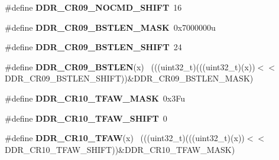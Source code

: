 \begin{DoxyCompactItemize}
\item 
\hypertarget{group___d_d_r___register___masks_ga78f46b37d1d9031c010ac4f32b38c45a}{}\#define {\bfseries D\+D\+R\+\_\+\+C\+R09\+\_\+\+N\+O\+C\+M\+D\+\_\+\+S\+H\+I\+F\+T}~16\label{group___d_d_r___register___masks_ga78f46b37d1d9031c010ac4f32b38c45a}

\item 
\hypertarget{group___d_d_r___register___masks_ga4c7f0ca0a836c4669e32ce4dcab4cd97}{}\#define {\bfseries D\+D\+R\+\_\+\+C\+R09\+\_\+\+B\+S\+T\+L\+E\+N\+\_\+\+M\+A\+S\+K}~0x7000000u\label{group___d_d_r___register___masks_ga4c7f0ca0a836c4669e32ce4dcab4cd97}

\item 
\hypertarget{group___d_d_r___register___masks_gaf14d2e173d38ce3d1227c04496cbcd52}{}\#define {\bfseries D\+D\+R\+\_\+\+C\+R09\+\_\+\+B\+S\+T\+L\+E\+N\+\_\+\+S\+H\+I\+F\+T}~24\label{group___d_d_r___register___masks_gaf14d2e173d38ce3d1227c04496cbcd52}

\item 
\hypertarget{group___d_d_r___register___masks_ga304381d47292897a1f71405f861be1a0}{}\#define {\bfseries D\+D\+R\+\_\+\+C\+R09\+\_\+\+B\+S\+T\+L\+E\+N}(x)                                          ~(((uint32\+\_\+t)(((uint32\+\_\+t)(x))$<$$<$D\+D\+R\+\_\+\+C\+R09\+\_\+\+B\+S\+T\+L\+E\+N\+\_\+\+S\+H\+I\+F\+T))\&D\+D\+R\+\_\+\+C\+R09\+\_\+\+B\+S\+T\+L\+E\+N\+\_\+\+M\+A\+S\+K)\label{group___d_d_r___register___masks_ga304381d47292897a1f71405f861be1a0}

\item 
\hypertarget{group___d_d_r___register___masks_gadd56500c472ce40ea6f6a335e49252f7}{}\#define {\bfseries D\+D\+R\+\_\+\+C\+R10\+\_\+\+T\+F\+A\+W\+\_\+\+M\+A\+S\+K}~0x3\+Fu\label{group___d_d_r___register___masks_gadd56500c472ce40ea6f6a335e49252f7}

\item 
\hypertarget{group___d_d_r___register___masks_ga5540561673eda03d9008474d171089bf}{}\#define {\bfseries D\+D\+R\+\_\+\+C\+R10\+\_\+\+T\+F\+A\+W\+\_\+\+S\+H\+I\+F\+T}~0\label{group___d_d_r___register___masks_ga5540561673eda03d9008474d171089bf}

\item 
\hypertarget{group___d_d_r___register___masks_ga536ed3653156cb8d143dde37e624b0d3}{}\#define {\bfseries D\+D\+R\+\_\+\+C\+R10\+\_\+\+T\+F\+A\+W}(x)                                              ~(((uint32\+\_\+t)(((uint32\+\_\+t)(x))$<$$<$D\+D\+R\+\_\+\+C\+R10\+\_\+\+T\+F\+A\+W\+\_\+\+S\+H\+I\+F\+T))\&D\+D\+R\+\_\+\+C\+R10\+\_\+\+T\+F\+A\+W\+\_\+\+M\+A\+S\+K)\label{group___d_d_r___register___masks_ga536ed3653156cb8d143dde37e624b0d3}


\end{DoxyCompactItemize}
